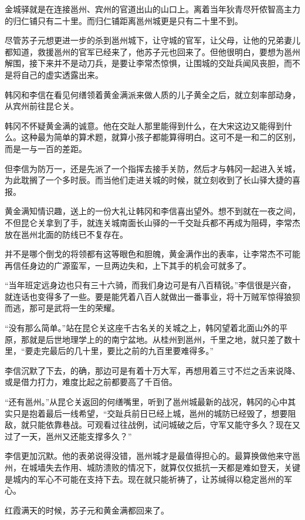 金城驿就是在连接邕州、宾州的官道出山的山口上。离着当年狄青尽歼侬智高主力的归仁铺只有二十里。而归仁铺距离邕州城更是只有二十里不到。

尽管苏子元想更进一步的杀到邕州城下，让守城的官军，让父母，让他的兄弟妻儿都知道，救援邕州的官军已经来了，他苏子元也回来了。但他很明白，要想为邕州解围，接下来并不是动刀兵，是要让李常杰惊惧，让围城的交趾兵闻风丧胆，而不是将自己的虚实透露出来。

韩冈和李信在看见何缮领着黄金满派来做人质的儿子黄全之后，就立刻率部动身，从宾州前往昆仑关。

韩冈不怀疑黄金满的诚意。他在交趾人那里能得到什么，在大宋这边又能得到什么。这种最为简单的算术题，就算小孩子都能算得明白。这可不是一和二的区别，而是一与一百的差距。

但李信为防万一，还是先派了一个指挥去接手关防，然后才与韩冈一起进入关城，为此耽搁了一个多时辰。而当他们走进关城的时候，就立刻收到了长山驿大捷的喜报。

黄金满知情识趣，送上的一份大礼让韩冈和李信喜出望外。想不到就在一夜之间，不但昆仑关拿到了手，就连关城南面长山驿的一千交趾兵都不再成为阻碍，李常杰放在邕州北面的防线已不复存在。

并不是哪个倒戈的将领都有这等眼色和胆魄，黄金满作出的表率，让李常杰不可能再信任身边的广源蛮军，一旦两边失和，上下其手的机会可就多了。

“当年班定远身边也只有三十六骑，而我们身边可是有八百精锐。”李信很是兴奋，就连话也变得多了一些。要是能凭着八百人就做出一番事业，将十万贼军惊得狼狈而逃，那可是武将一生的荣耀。

“没有那么简单。”站在昆仑关这座千古名关的关城之上，韩冈望着北面山外的平原，那就是后世地理学上的的南宁盆地。从桂州到邕州，千里之地，就只差了数十里，“要走完最后的几十里，要比之前的九百里要难得多。”

李信沉默了下去，的确，那边可是有着十万大军，再想用着三寸不烂之舌来说降、或是借力打力，难度比起之前都要高了千百倍。

“还有邕州。”从昆仑关返回的何缮嘴里，听到了邕州城最新的战况，韩冈的心中其实只是抱着最后一线希望，“交趾兵前日已经上城，邕州的城防已经毁了，想要阻敌，就只能依靠巷战。可观看过往战例，试问城破之后，守军又能守多久？现在又过了一天，邕州又还能支撑多久？”

李信更加沉默。他的表弟说得没错，邕州城才是最值得担心的。最算换做他来守邕州，在城墙失去作用、城防溃败的情况下，就算仅仅抵抗一天都是难如登天，关键是城内的军心不可能在支持下去。现在就只能祈祷了，让苏缄得以稳定邕州的军心。

红霞满天的时候，苏子元和黄金满都回来了。

